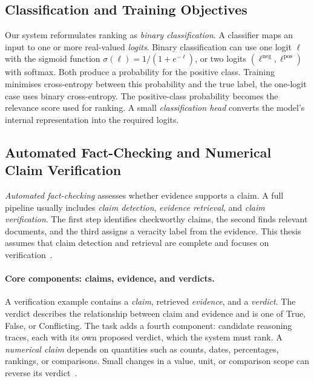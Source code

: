\subsection{Classification and Training Objectives}
\label{subsec:bg-classification}

Our system reformulates ranking as \emph{binary classification}. A classifier maps an input to one or
more real-valued \emph{logits}. Binary classification can use one logit $\ell$ with the sigmoid
function $\sigma(\ell) = 1/(1+e^{-\ell})$, or two logits
$(\ell^{\text{neg}}, \ell^{\text{pos}})$ with softmax. Both produce a probability for the positive
class. Training minimises cross-entropy between this probability and the true label, the one-logit
case uses binary cross-entropy. The positive-class probability becomes the relevance score used for
ranking. A small \emph{classification head} converts the model's internal representation into the
required logits.

\subsection{Automated Fact-Checking and Numerical Claim Verification}
\label{subsec:bg-factcheck}

\emph{Automated fact-checking} assesses whether evidence supports a claim. A full pipeline usually
includes \emph{claim detection}, \emph{evidence retrieval}, and \emph{claim verification}. The first
step identifies checkworthy claims, the second finds relevant documents, and the third assigns a
veracity label from the evidence. This thesis assumes that claim detection and retrieval are complete
and focuses on verification~\cite{sahitaj2025automatedfactcheckingrealworldclaims}.

\paragraph{Core components: claims, evidence, and verdicts.}
A verification example contains a \emph{claim}, retrieved \emph{evidence}, and a \emph{verdict}. The
verdict describes the relationship between claim and evidence and is one of \textsf{True},
\textsf{False}, or \textsf{Conflicting}. The task adds a fourth component: candidate reasoning traces,
each with its own proposed verdict, which the system must rank. A \emph{numerical claim} depends on
quantities such as counts, dates, percentages, rankings, or comparisons. Small changes in a value,
unit, or comparison scope can reverse its verdict~\cite{v2024quantemprealworldopendomainbenchmark}.

